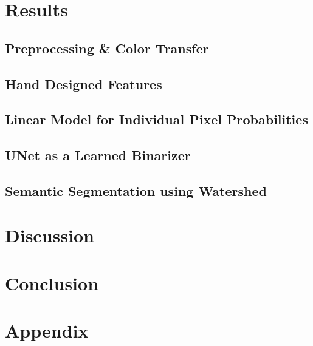 \documentclass[paper=letter, fontsize=12pt]{article}
\newcommand\includeappendices{%
  \appendix
  \renewcommand{\thesection}{\Alph{section}}
  \section{Appendix}
  \the\mainnotetoks}
\numberwithin{equation}{section} %
\numberwithin{figure}{section} %
\numberwithin{table}{section} %
\begin{document}
\section{Results}

\subsection{Preprocessing \& Color Transfer}

\subsection{Hand Designed Features}

\subsection{Linear Model for Individual Pixel Probabilities}

\subsection{UNet as a Learned Binarizer}

\subsection{Semantic Segmentation using Watershed}

\section{Discussion}

\section{Conclusion}

\newpage

\printbibliography

\newpage

\includeappendices
\end{document}
